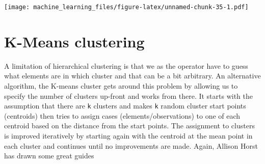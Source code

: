 \documentclass[
]{book}
\begin{document}
\texttt{[image: machine\_learning\_files/figure-latex/unnamed-chunk-35-1.pdf]}

\hypertarget{k-means-clustering}{%
\section{K-Means clustering}\label{k-means-clustering}}

A limitation of hierarchical clustering is that we as the operator have to guess what elements are in which cluster and that can be a bit arbitrary. An alternative algorithm, the K-means cluster gets around this problem by allowing us to specify the number of clusters up-front and works from there. It starts with the assumption that there are \texttt{k} clusters and makes \texttt{k} random cluster start points (centroids) then tries to assign cases (elements/observations) to one of each centroid based on the distance from the start points. The assignment to clusters is improved iteratively by starting again with the centroid at the mean point in each cluster and continues until no improvements are made. Again, Allison Horst has drawn some great guides
\end{document}
